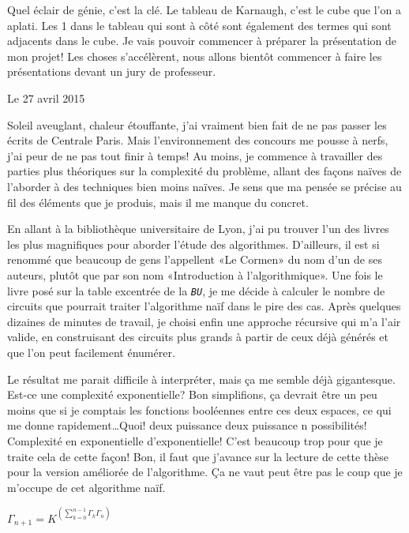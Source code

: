 \documentclass[12pt,final]{report} %
\newcommand{\datemarge}[1]{%
   \newpage
        {\color{blue}#1}

}
\newcommand{\majuscule}[1]{\emph{\texttt{#1}}}
\begin{document}
{Quel éclair de génie, c'est la clé. Le tableau de Karnaugh, c'est le cube que l'on a aplati.
Les 1 dans le tableau qui sont à côté sont également des termes qui sont adjacents dans le cube.
Je vais pouvoir commencer à préparer la présentation de mon projet!
Les choses s'accélèrent, nous allons bientôt commencer à faire les présentations devant un jury de professeur.

\datemarge{Le 27 avril 2015}

Soleil aveuglant, chaleur étouffante, j'ai vraiment bien fait de ne pas passer les écrits de Centrale Paris.
Mais l'environnement des concours me pousse à nerfs, j'ai peur de ne pas tout finir à temps!
Au moins, je commence à travailler des parties plus théoriques sur la complexité du problème, allant des façons naïves de l'aborder à des techniques bien moins naïves.
Je sens que ma pensée se précise au fil des éléments que je produis, mais il me manque du concret.

En allant à la bibliothèque universitaire de Lyon, j'ai pu trouver l'un des livres les plus magnifiques pour aborder l'étude des algorithmes. 
D'ailleurs, il est si renommé que beaucoup de gens l'appellent «Le Cormen» du nom d'un de ses auteurs, plutôt que par son nom «Introduction à l'algorithmique».
Une fois le livre posé sur la table excentrée de la \majuscule{BU}, je me décide à calculer le nombre de circuits que pourrait traiter l'algorithme naïf dans le pire des cas.
Après quelques dizaines de minutes de travail, je choisi enfin une approche récursive qui m'a l'air valide, en construisant des circuits plus grands à partir de ceux déjà générés et que l'on peut facilement énumérer.

Le résultat me parait difficile à interpréter, mais ça me semble déjà gigantesque. Est-ce une complexité exponentielle?
Bon simplifions, ça devrait être un peu moins que si je comptais les fonctions booléennes entre ces deux espaces, ce qui me donne rapidement\dots Quoi! deux puissance deux puissance n possibilités! Complexité en exponentielle d'exponentielle!
C'est beaucoup trop pour que je traite cela de cette façon!
Bon, il faut que j'avance sur la lecture de cette thèse pour la version améliorée de l'algorithme.
Ça ne vaut peut être pas le coup que je m'occupe de cet algorithme naïf.
\vspace{0.4cm}
\begin{center}$\Gamma_{n+1} = K^{\left(\sum_{k=0}^{n-1} \Gamma_k \Gamma_n\right)}$\end{center}


}
\end{document}
